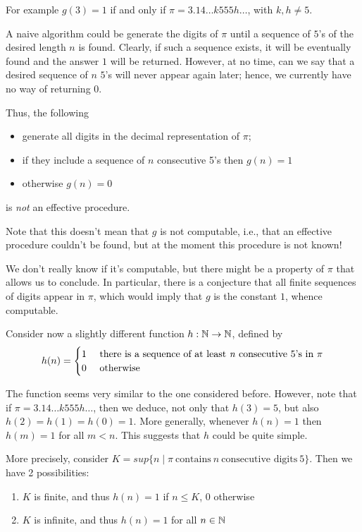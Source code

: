 For example $g(3) = 1$ if and only if  $\pi = 3.14 \dots k 555 h \dots $, with $k, h \neq 5$.

A naive algorithm could be generate the digits of $\pi$ until a sequence of $5$'s of the desired length $n$ is found.
Clearly, if such a sequence exists, it will be eventually found and the answer $1$ will be returned. 
However, at no time, can we say that a desired sequence of $n$ $5$'s will never appear again later; hence, we currently have no way of returning $0$.

\begin{remark}
  Thus, the following
   \begin{itemize}
   \item generate all digits in the decimal representation of $\pi$;
   \item if they include a sequence of $n$ consecutive 5's then
    $g(n) = 1$
  \item otherwise $g(n) = 0$
\end{itemize}
is \emph{not} an effective procedure.
\end{remark}

Note that this doesn't mean that $g$ is not computable, i.e., that an
effective procedure couldn't be found, but at the moment this procedure is not known!

We don't really know if it's computable, but there might be a property
of $\pi$ that allows us to conclude. In particular, there is a conjecture that all
finite sequences of digits appear in $\pi$, which would imply that $g$
is the constant $1$, whence computable.

\medskip

Consider now a slightly different function $h: \mathbb{N} \to \mathbb{N}$, defined by
\begin{equation*}
  h(n) = \begin{cases}
    1 & $ there is a sequence of at least  \textit{n} consecutive $5$'s in $ \pi \\
    0 & $ otherwise $
  \end{cases}
\end{equation*}

The function seems very similar to the one considered before. However, note that if $\pi = 3.14 \dots k 555 h \dots $, then we deduce, not only that $h(3)=5$, but also $h(2)=h(1)=h(0)=1$. 
More generally, whenever $h(n) =1$ then $h(m)=1$ for all $m < n$. This suggests that $h$ could be quite simple.

More precisely, consider $K = sup\{ n \mid \pi\ \text{contains}\ n\ \text{consecutive digits}\ 5 \}$. Then we have 2 possibilities:
\begin{enumerate}
\item $K$ is finite, and thus $h(n) = 1$ if $ n\leq K$, $0$ otherwise
\item $K$ is infinite, and thus $ h(n) = 1$ for all $n \in \mathbb{N}$
\end{enumerate}

